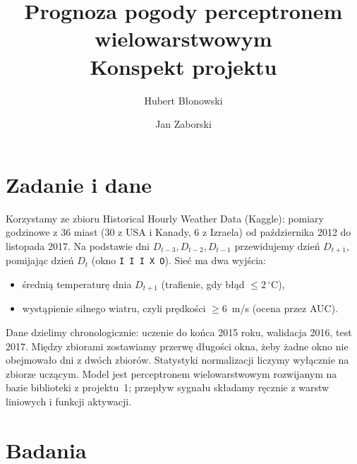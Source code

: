 \documentclass{article}
\title{Prognoza pogody perceptronem wielowarstwowym\\ \large Konspekt projektu}
\author{Hubert Błonowski \and Jan Zaborski}
\date{}
\begin{document}
\maketitle

\section*{Zadanie i dane}
Korzystamy ze zbioru Historical Hourly Weather Data (Kaggle): pomiary godzinowe z 36 miast
(30 z USA i Kanady, 6 z Izraela) od października 2012 do listopada 2017.
Na podstawie dni $D_{t-3}, D_{t-2}, D_{t-1}$ przewidujemy dzień $D_{t+1}$, pomijając dzień $D_t$ (okno \texttt{I I I X O}).
Sieć ma dwa wyjścia:
\begin{itemize}
  \item średnią temperaturę dnia $D_{t+1}$ (trafienie, gdy błąd $\le 2\,^\circ$C),
  \item wystąpienie silnego wiatru, czyli prędkości $\ge 6$~m/s (ocena przez AUC).
\end{itemize}

Dane dzielimy chronologicznie: uczenie do końca 2015 roku, walidacja 2016, test 2017.
Między zbiorami zostawiamy przerwę długości okna, żeby żadne okno nie obejmowało dni z dwóch zbiorów.
Statystyki normalizacji liczymy wyłącznie na zbiorze uczącym.
Model jest perceptronem wielowarstwowym rozwijanym na bazie biblioteki z projektu~1;
przepływ sygnału składamy ręcznie z warstw liniowych i funkcji aktywacji.

\section{Badania}
\end{document}
